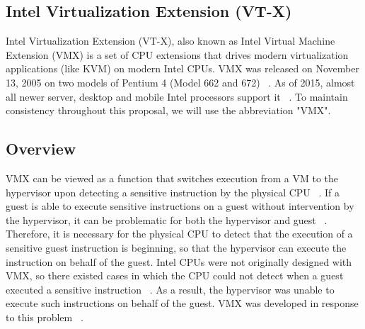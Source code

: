 \documentclass{report}
\begin{document}
\begin{spacing}{1.5}
\section{Intel Virtualization Extension (VT-X)}

{\large
Intel Virtualization Extension (VT-X), also known as Intel Virtual Machine Extension (VMX) is a set of CPU extensions that drives modern virtualization applications (like KVM) on modern Intel CPUs. VMX was released on November 13, 2005 on two models of Pentium 4 (Model 662 and 672) ~\cite{intelvirtualizationlist}. As of 2015, almost all newer server, desktop and mobile Intel processors support it ~\cite{intelvirtualizationlist}. To maintain consistency throughout this proposal, we will use the abbreviation "VMX".
\newline
}


\subsection{Overview}

{\large
VMX can be viewed as a function that switches execution from a VM to the hypervisor upon detecting a sensitive instruction by the physical CPU ~\cite{goto2011kernel}. If a guest is able to execute sensitive instructions on a guest without intervention by the hypervisor, it can be problematic for both the hypervisor and guest ~\cite{goto2011kernel}. Therefore, it is necessary for the physical CPU to detect that the execution of a sensitive guest instruction is beginning, so that the hypervisor can execute the instruction on behalf of the guest. Intel CPUs were not originally designed with VMX, so there existed cases in which the CPU could not detect when a guest executed a sensitive instruction ~\cite{10.1007/978-3-642-25141-2_7}. As a result, the hypervisor was unable to execute such instructions on behalf of the guest. VMX was developed in response to this problem ~\cite{goto2011kernel}.
\newline
}


\end{spacing}
\end{document}

